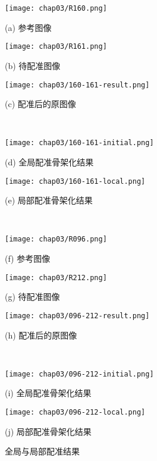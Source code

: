 \begin{figure}[!ht]
\centering

\begin{minipage}[b]{0.3\textwidth} 
      \centering 
      \texttt{[image: chap03/R160.png]}
        \centerline{(a) 参考图像}\medskip
\end{minipage}
  \begin{minipage}[b]{0.3\textwidth}
    \centering
    \texttt{[image: chap03/R161.png]}
      \centerline{(b) 待配准图像}\medskip
  \end{minipage}
\begin{minipage}[b]{0.3\textwidth}
	\centering
      \texttt{[image: chap03/160-161-result.png]}
        \centerline{(c) 配准后的原图像}\medskip
    \end{minipage}
\\
  \begin{minipage}[b]{0.48\textwidth}
    \centering
    \texttt{[image: chap03/160-161-initial.png]}
      \centerline{(d) 全局配准骨架化结果}\medskip
  \end{minipage}
 \begin{minipage}[b]{0.48\textwidth}
    \centering
      \texttt{[image: chap03/160-161-local.png]}
        \centerline{(e) 局部配准骨架化结果}\medskip
    \end{minipage}
\\
  \begin{minipage}[b]{0.3\textwidth}
    \centering
    \texttt{[image: chap03/R096.png]}
      \centerline{(f) 参考图像}\medskip
  \end{minipage}
\begin{minipage}[b]{0.3\textwidth}
      \texttt{[image: chap03/R212.png]}
       \centerline{(g) 待配准图像}\medskip
    \end{minipage}
  \begin{minipage}[b]{0.3\textwidth}
    \centering
    \texttt{[image: chap03/096-212-result.png]}
          \centerline{(h) 配准后的原图像}\medskip
  \end{minipage}
\\
 \begin{minipage}[b]{0.48\textwidth}
    \centering
      \texttt{[image: chap03/096-212-initial.png]}
       \centerline{(i) 全局配准骨架化结果}\medskip
    \end{minipage}
  \begin{minipage}[b]{0.48\textwidth}
    \centering
    \texttt{[image: chap03/096-212-local.png]}
           \centerline{(j) 局部配准骨架化结果}\medskip
  \end{minipage}
\caption{全局与局部配准结果}
\label{fig:final-results}
\end{figure}
